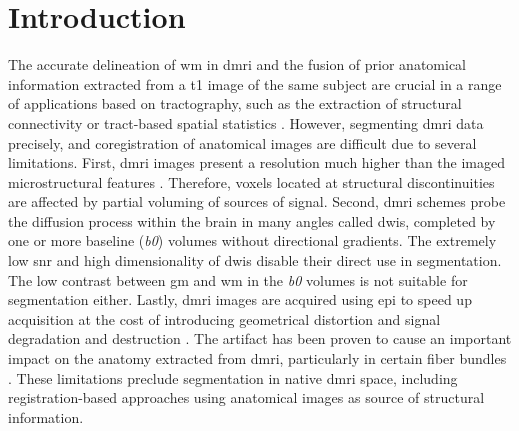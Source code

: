 \section{Introduction}\label{sec:introduction}
The accurate delineation of \gls*{wm} in \gls*{dmri} and the fusion of prior
  anatomical information extracted from a \gls*{t1} image of the same subject
  are crucial in a range of applications based on tractography, such as
  the extraction of structural connectivity \citep{craddock_imaging_2013} or
  tract-based spatial statistics \citep{smith_tractbased_2006}.
However, segmenting \gls*{dmri} data precisely, and coregistration of anatomical
  images are difficult due to several limitations.
First, \gls{dmri} images present a resolution much higher than the imaged
  microstructural features \citep{basser_microstructural_1996}.
Therefore, voxels located at structural discontinuities are affected by partial
  voluming of sources of signal.
Second, \gls*{dmri} schemes probe the diffusion process within the brain in 
  many angles called \glspl*{dwi}, completed by one or more baseline (\emph{b0}) 
  volumes without directional gradients.
The extremely low \gls*{snr} and high dimensionality of \glspl*{dwi} disable their
  direct use in segmentation.
The low contrast between \gls*{gm} and \gls*{wm} in the \emph{b0} volumes is not suitable for 
  segmentation either.
Lastly, \gls*{dmri} images are acquired using \gls*{epi} to speed up acquisition
  at the cost of introducing geometrical distortion and signal degradation and
  destruction \citep{jezzard_correction_1995}.
The artifact has been proven to cause an important impact on the anatomy extracted
  from \gls*{dmri}, particularly in certain fiber bundles \citep{irfanoglu_effects_2012}.
These limitations preclude segmentation in native \gls*{dmri} space, including
  registration-based approaches using anatomical images as source of structural
  information.


